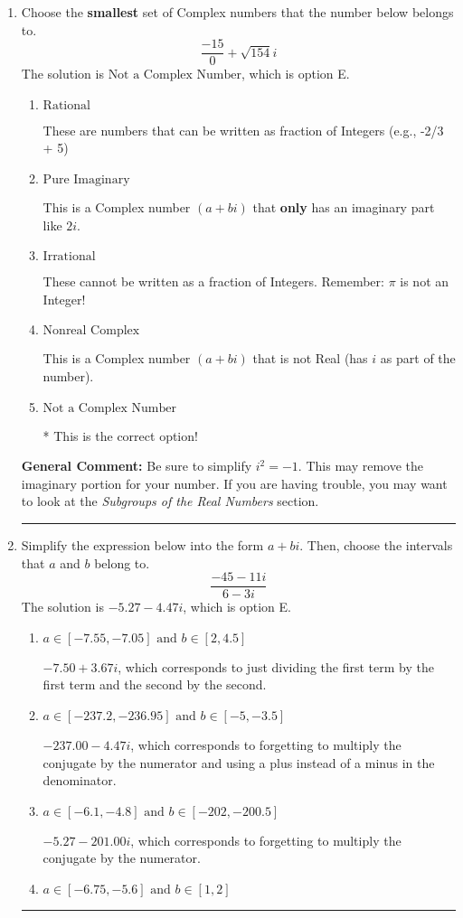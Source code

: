 \documentclass{extbook}[14pt]
\newcommand{\litem}[1]{\item #1

\rule{\textwidth}{0.4pt}}
\begin{document}
\begin{enumerate}\litem{
Choose the \textbf{smallest} set of Complex numbers that the number below belongs to.
\[ \frac{-15}{0}+\sqrt{154} i \]The solution is \( \text{Not a Complex Number} \), which is option E.\begin{enumerate}[label=\Alph*.]
\item \( \text{Rational} \)

These are numbers that can be written as fraction of Integers (e.g., -2/3 + 5)
\item \( \text{Pure Imaginary} \)

This is a Complex number $(a+bi)$ that \textbf{only} has an imaginary part like $2i$.
\item \( \text{Irrational} \)

These cannot be written as a fraction of Integers. Remember: $\pi$ is not an Integer!
\item \( \text{Nonreal Complex} \)

This is a Complex number $(a+bi)$ that is not Real (has $i$ as part of the number).
\item \( \text{Not a Complex Number} \)

* This is the correct option!
\end{enumerate}

\textbf{General Comment:} Be sure to simplify $i^2 = -1$. This may remove the imaginary portion for your number. If you are having trouble, you may want to look at the \textit{Subgroups of the Real Numbers} section.
}
\litem{
Simplify the expression below into the form $a+bi$. Then, choose the intervals that $a$ and $b$ belong to.
\[ \frac{-45 - 11 i}{6 - 3 i} \]The solution is \( -5.27  - 4.47 i \), which is option E.\begin{enumerate}[label=\Alph*.]
\item \( a \in [-7.55, -7.05] \text{ and } b \in [2, 4.5] \)

 $-7.50  + 3.67 i$, which corresponds to just dividing the first term by the first term and the second by the second.
\item \( a \in [-237.2, -236.95] \text{ and } b \in [-5, -3.5] \)

 $-237.00  - 4.47 i$, which corresponds to forgetting to multiply the conjugate by the numerator and using a plus instead of a minus in the denominator.
\item \( a \in [-6.1, -4.8] \text{ and } b \in [-202, -200.5] \)

 $-5.27  - 201.00 i$, which corresponds to forgetting to multiply the conjugate by the numerator.
\item \( a \in [-6.75, -5.6] \text{ and } b \in [1, 2] \)


\end{enumerate}}
\end{enumerate}
\end{document}
